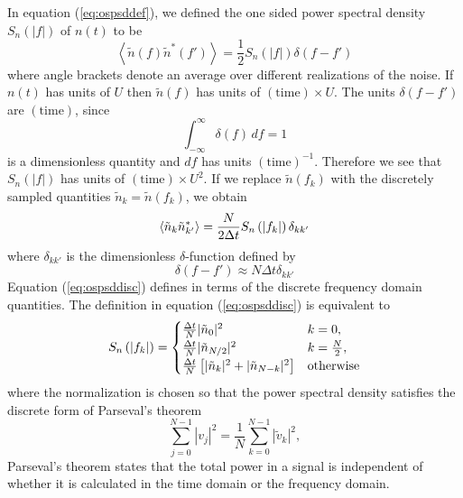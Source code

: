In equation (\ref{eq:ospsddef}), we defined the one sided power spectral
density $S_n(|f|)$ of $n(t)$ to be 
\begin{equation}
\left\langle\tilde{n}(f) \tilde{n}^\ast(f')\right\rangle = 
\frac{1}{2}S_n(|f|)\delta(f-f')
\end{equation}
where angle brackets denote an average over different realizations of the noise.
If $n(t)$ has units of $U$ then $\tilde{n}(f)$ has units of
$(\mathrm{time}) \times U$. The units $\delta(f-f')$ are $(\mathrm{time})$,
since 
\begin{equation}
\int_{-\infty}^\infty \delta(f)\,df = 1
\end{equation}
is a dimensionless quantity and $df$ has units $(\mathrm{time})^{-1}$.
Therefore we see that $S_n(|f|)$ has units of $(\mathrm{time})\times U^2$.
If we replace $\tilde{n}(f_k)$ with the discretely sampled quantities 
$\tilde{n}_k = \tilde{n}(f_k)$, we obtain
\begin{equation}
\left\langle\tilde{n}_k \tilde{n}_{k'}^\ast\right\rangle = 
\frac{N}{2\Delta t}S_n\left(\left|f_{k}\right|\right)\delta_{kk'}
\label{eq:ospsddisc}
\end{equation}
where $\delta_{kk'}$ is the dimensionless $\delta$-function defined by
\begin{equation}
\delta(f-f') \approx N\Delta t\delta_{kk'}
\end{equation}
Equation (\ref{eq:ospsddisc}) defines \ospsd in terms of the discrete
frequency domain quantities.  The definition in equation (\ref{eq:ospsddisc}) is
equivalent to
\begin{equation}
S_n\left(\left|f_{k}\right|\right) =
\begin{cases}
\frac{\Delta t}{N} | \tilde{n}_0 |^2 & k = 0, \\
\frac{\Delta t}{N} | \tilde{n}_{N/2} |^2 & k = \frac{N}{2}, \\
\frac{\Delta t}{N} \left[ | \tilde{n}_k |^2 + | \tilde{n}_{N-k} |^2 \right] & \text{otherwise}
\end{cases}
\end{equation}
where the normalization is chosen so that the power spectral
density satisfies the discrete form of Parseval's theorem
\begin{equation}
\sum_{j=0}^{N-1} |v_j|^2 = \frac{1}{N} \sum_{k=0}^{N-1} |\tilde{v}_k|^2,
\end{equation}
Parseval's theorem states that the total power in a signal is independent of
whether it is calculated in the time domain or the frequency domain.

